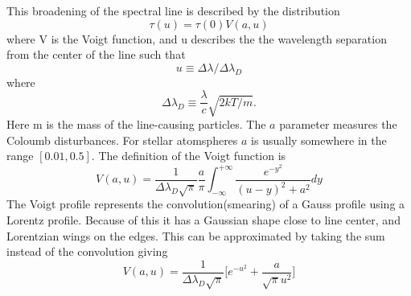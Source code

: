 \documentclass{aa}   %
\begin{document}
This broadening of the spectral line is described by the distribution
\begin{equation}
 \tau(u) = \tau(0)V(a,u)
\end{equation}\label{distribution}
where V is the Voigt function, and u describes the the wavelength separation from the center of the line such that
\begin{equation}
 u \equiv \Delta\lambda/\Delta\lambda_D
\end{equation}
where
\begin{equation}
 \Delta\lambda_D \equiv \frac{\lambda}{c} \sqrt{2kT/m}.
\end{equation}
Here m is the mass of the line-causing particles.
The $a$ parameter measures the Coloumb disturbances. For stellar atomspheres $a$ is usually somewhere in the range $[0.01,0.5]$. The definition of the Voigt function is
\begin{equation}
 V(a,u) = \frac{1}{\Delta\lambda_D\sqrt{\pi}}\frac{a}{\pi}\int_{-\infty}^{+\infty}\frac{e^{-y^2}}{(u-y)^2 + a^2}dy
\end{equation}\label{Voigt}
The Voigt profile represents the convolution(smearing) of a Gauss profile using a Lorentz profile. Because of this it has a Gaussian shape close to line center, and Lorentzian wings on the edges.
This can be approximated by taking the sum instead of the convolution giving 
\begin{equation}
 V(a,u) = \frac{1}{\Delta\lambda_D\sqrt{\pi}} \bigg[e^{-u^2} + \frac{a}{\sqrt{\pi}u^2}\bigg]
\end{equation}\label{Voigt_approx}
\end{document}
